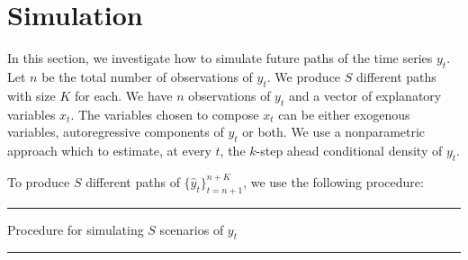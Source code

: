 \section{Simulation}
\label{sec:simulation}

In this section, we investigate how to simulate future paths of the time series $y_t$. 
Let $n$ be the total number of observations of $y_t$. We produce $S$ different paths with size $K$ for each. 
We have $n$ observations of $y_t$ and a vector of explanatory variables $x_t$.
The variables chosen to compose $x_t$ can be either exogenous variables, autoregressive components of $y_t$ or both. We use a nonparametric approach which to estimate, at every $t$, the $k$-step ahead conditional density of $y_t$.

To produce $S$ different paths of $\{ \hat{y}_t \}_{t=n+1}^{n+K}$, we use the following procedure:

\noindent\rule{\columnwidth}{3pt}

Procedure for simulating $S$ scenarios of $y_t$

\noindent\rule{\columnwidth}{1pt}

